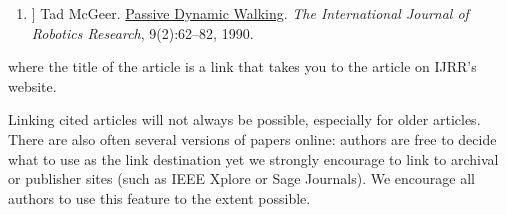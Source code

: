 \def\tmplabel#1{[#1]}

\begin{enumerate}
\item[\tmplabel{1}] Tad McGeer. \href{http://ijr.sagepub.com/content/9/2/62.abstract}{Passive Dynamic
Walking}. {\em The International Journal of Robotics Research}, 9(2):62--82,
1990.
\end{enumerate}
%
where the title of the article is a link that takes you to the article on IJRR's website. 


Linking cited articles will not always be possible, especially for
older articles. There are also often several versions of papers
online: authors are free to decide what to use as the link destination
yet we strongly encourage to link to archival or publisher sites
(such as IEEE Xplore or Sage Journals).  We encourage all authors to use this feature to
the extent possible.

